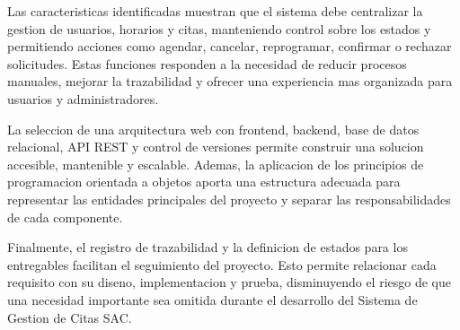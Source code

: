 \documentclass[12pt,letterpaper]{article}
\begin{document}
Las caracteristicas identificadas muestran que el sistema debe centralizar la gestion de usuarios, horarios y citas, manteniendo control sobre los estados y permitiendo acciones como agendar, cancelar, reprogramar, confirmar o rechazar solicitudes. Estas funciones responden a la necesidad de reducir procesos manuales, mejorar la trazabilidad y ofrecer una experiencia mas organizada para usuarios y administradores.

La seleccion de una arquitectura web con frontend, backend, base de datos relacional, API REST y control de versiones permite construir una solucion accesible, mantenible y escalable. Ademas, la aplicacion de los principios de programacion orientada a objetos aporta una estructura adecuada para representar las entidades principales del proyecto y separar las responsabilidades de cada componente.

Finalmente, el registro de trazabilidad y la definicion de estados para los entregables facilitan el seguimiento del proyecto. Esto permite relacionar cada requisito con su diseno, implementacion y prueba, disminuyendo el riesgo de que una necesidad importante sea omitida durante el desarrollo del Sistema de Gestion de Citas SAC.
\end{document}
